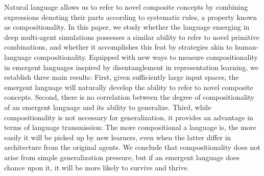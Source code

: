 Natural language allows us to refer to novel composite concepts by combining expressions denoting their parts according to systematic rules, a property known as compositionality. In this paper, we study whether the language emerging in deep multi-agent simulations possesses a similar ability to refer to novel primitive combinations, and whether it accomplishes this feat by strategies akin to human-language compositionality. Equipped with new ways to measure compositionality in emergent languages inspired by disentanglement in representation learning, we establish three main results: First, given sufficiently large input spaces, the emergent language will naturally develop the ability to refer to novel composite concepts. Second, there is no correlation between the degree of compositionality of an emergent language and its ability to generalize. Third, while compositionality is not necessary for generalization, it provides an advantage in terms of language transmission: The more compositional a language is, the more easily it will be picked up by new learners, even when the latter differ in architecture from the original agents. We conclude that compositionality does not arise from simple generalization pressure, but if an emergent language does chance upon it, it will be more likely to survive and thrive.
